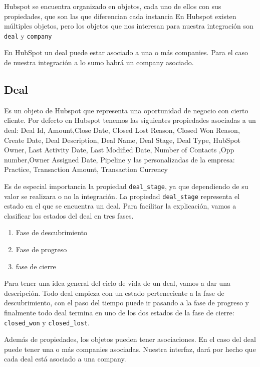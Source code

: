 Hubspot se encuentra organizado en objetos, cada uno de ellos con sus propiedades, que son las que diferencian cada instancia
En Hubspot existen múltiples objetos, pero los objetos que nos interesan para nuestra integración son \verb|deal| y \verb|company|



En HubSpot un deal puede estar asociado a una o más companies. Para el caso de nuestra integración a lo sumo habrá un company asociado.

\subsection{Deal}
	Es un objeto de Hubspot que representa una oportunidad de negocio con cierto cliente. Por defecto en Hubspot tenemos las siguientes propiedades asociadas a un deal:			
		Deal Id, Amount,Close Date, Closed Lost Reason, Closed Won Reason, Create Date, Deal Description, Deal Name, Deal Stage, Deal Type, HubSpot Owner, Last Activity Date, Last Modified Date, Number of Contacts
		,Opp number,Owner Assigned Date, Pipeline y las personalizadas de la empresa: Practice, Transaction Amount, Transaction Currency
		
		Es de especial importancia la propiedad \verb|deal_stage|, ya que dependiendo de su valor se realizara o no la integración.
		La propiedad \verb|deal_stage| representa el estado en el que se encuentra un deal. Para facilitar la explicación, vamos a clasificar los estados del deal en tres fases.
		\begin{enumerate}
			\item Fase de descubrimiento
			\item Fase de progreso 
			\item fase de cierre
		\end{enumerate}
		Para tener una idea general del ciclo de vida de un deal, vamos a dar una descripción. Todo deal empieza con un estado perteneciente a la fase de descubrimiento, con el paso del tiempo puede ir pasando a la fase de progreso y finalmente todo deal termina en uno de los dos estados de la fase de cierre: \verb|closed_won| y \verb|closed_lost|.
		
		
			
			
			
		Además de propiedades, los objetos pueden tener asociaciones. En el caso del deal puede tener una o más companies asociadas. Nuestra interfaz, dará por hecho que cada deal está asociado a una company.
			

